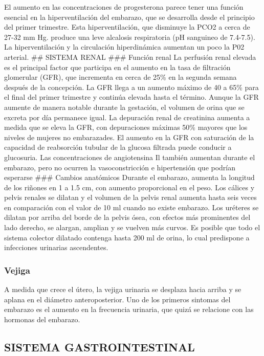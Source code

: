 \documentclass[
]{article}
\begin{document}
El aumento en las concentraciones de progesterona parece tener una
función esencial en la hiperventilación del embarazo, que se desarrolla
desde el principio del primer trimestre. Esta hiperventilación, que
disminuye la PCO2 a cerca de 27-32 mm Hg. produce una leve alcalosis
respiratoria (pH sanguineo de 7.4-7.5). La hiperventilación y la
circulación hiperdinámica aumentan un poco la P02 arterial. \#\# SISTEMA
RENAL \#\#\# Función renal La perfusión renal elevada es el principal
factor que participa en el aumento en la tasa de filtración glomerular
(GFR), que incrementa en cerca de 25\% en la segunda semana después de
la concepción. La GFR llega a un aumento máximo de 40 a 65\% para el
final del primer trimestre y continúa elevada hasta el término. Aunque
la GFR aumente de manera notable durante la gestación, el volumen de
orina que se excreta por día permanece igual. La depuración renal de
creatinina aumenta a medida que se eleva la GFR, con depuraciones
máximas 50\% mayores que los niveles de mujeres no embarazades. El
aumento en la GFR con saturación de la capacidad de reabsorción tubular
de la glucosa filtrada puede conducir a glucosuria. Las concentraciones
de angiotensina Il también aumentan durante el embarazo, pero no ocurren
la vasoconstricción e hipertensión que podrían esperarse \#\#\# Cambios
anatómicos Durante el embarazo, aumenta la longitud de los riñones en 1
a 1.5 cm, con aumento proporcional en el peso. Los cálices y pelvis
renales se dilatan y el volumen de la pelvis renal aumenta hasta seis
veces en comparación con el valor de 10 ml cuando no existe embarazo.
Los uréteres se dilatan por arriba del borde de la pelvis ósea, con
efectos más prominentes del lado derecho, se alargan, amplian y se
vuelven más curvos. Es posible que todo el sistema colector dilatado
contenga hasta 200 ml de orina, lo cual predispone a infecciones
urinarias ascendentes.

\hypertarget{vejiga}{%
\subsubsection{Vejiga}\label{vejiga}}

A medida que crece el útero, la vejiga urinaria se desplaza hacia arriba
y se aplana en el diámetro anteroposterior. Uno de los primeros sintomas
del embarazo es el aumento en la frecuencia urinaria, que quizá se
relacione con las hormonas del embarazo.

\hypertarget{sistema-gastrointestinal}{%
\subsection{SISTEMA GASTROINTESTINAL}\label{sistema-gastrointestinal}}
\end{document}
